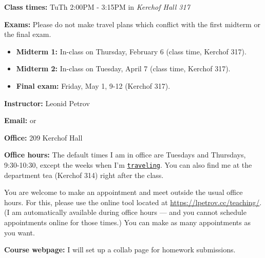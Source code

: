 \documentclass[oneside,11pt]{amsart}
\begin{document}
\textbf{Class times:}   TuTh 2:00PM - 3:15PM in
\emph{Kerchof Hall 317}

\medskip


\textbf{Exams:} Please do not make travel plans which conflict
with the first midterm or the final exam.
\begin{itemize}
	\item \textbf{Midterm 1:} In-class on Thursday, February 6 (class time, Kerchof 317).
	\item \textbf{Midterm 2:} In-class on Tuesday, April 7 (class time, Kerchof 317).
	\item \textbf{Final exam:} Friday, May 1, 9-12 (Kerchof 317).
\end{itemize}

\medskip

\textbf{Instructor:} Leonid Petrov
\medskip

\textbf{Email:}  or 
\medskip

\textbf{Office:} 209 Kerchof Hall
\medskip

\textbf{Office hours:}
The default times I am in office are Tuesdays and Thursdays, 9:30-10:30,
except the weeks when I'm \href{https://lpetrov.cc/2019/05/travel-2020/}{\texttt{traveling}}.
You can also find me at the department tea (Kerchof 314) right after the class.

You are welcome to make an appointment and meet outside the usual office hours. 
For this, please use the online tool located at
\url{https://lpetrov.cc/teaching/}. (I am automatically available during office hours --- 
and you cannot schedule appointments online for those times.)
You can make as 
many appointments as you want.

\medskip

\textbf{Course webpage:}
I will set up a collab page for homework submissions.
\end{document}
